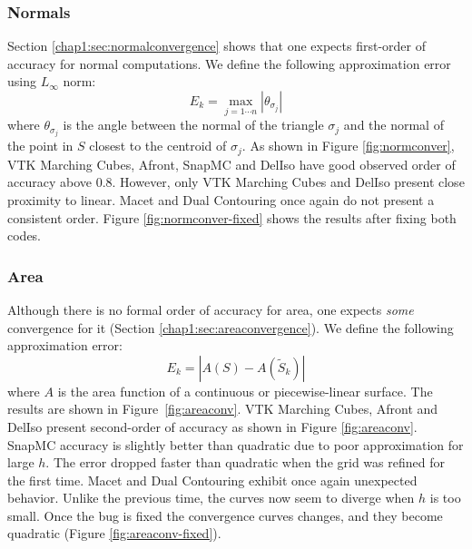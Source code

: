 
\subsubsection{Normals}
\label{subchap1:sec:normal-convergence}

Section \ref{chap1:sec:normalconvergence} shows that 
one expects first-order of accuracy for normal computations. 
We define the following approximation error using $L_\infty$ norm:
\begin{equation}
E_{k} = \max_{j=1\cdots n}|\theta_{\sigma_j}|
\label{eq:normerror}
\end{equation}
where $\theta_{\sigma_j}$ is the angle between the normal of 
the triangle $\sigma_j$ and the normal of 
the point in $S$ closest to the centroid of $\sigma_j$.
As shown in Figure \ref{fig:normconver}, VTK Marching Cubes, Afront,
SnapMC and DelIso have good observed order of accuracy above $0.8$. However, only 
VTK Marching Cubes and DelIso present close proximity to linear. 
Macet and Dual Contouring once again do not present a consistent order. 
Figure \ref{fig:normconver-fixed} shows the results after fixing both codes.

\subsubsection{Area}
\label{chap1:sec:area-observed-order-of-accuracy}

Although there is no formal order of accuracy for area, one expects \emph{some}
convergence for it (Section \ref{chap1:sec:areaconvergence}).
We define the following approximation error:
\begin{equation}
E_{k} = |A(S) - A(\tilde{S}_k)|
\label{eq:surfareaerror}
\end{equation}
where $A$ is the area function of a continuous or piecewise-linear surface. 
The results are shown in Figure~\ref{fig:areaconv}. 
VTK Marching Cubes, Afront and DelIso present second-order of accuracy as shown 
in Figure \ref{fig:areaconv}. SnapMC accuracy is slightly better than quadratic due 
to poor approximation for large $h$. The error dropped faster than quadratic when the 
grid was refined for the first time. Macet and Dual Contouring exhibit once again  
unexpected behavior. Unlike the previous time, the curves now seem to diverge 
when $h$ is too small. Once the bug is fixed the convergence curves changes,
and they become quadratic (Figure \ref{fig:areaconv-fixed}).
 
